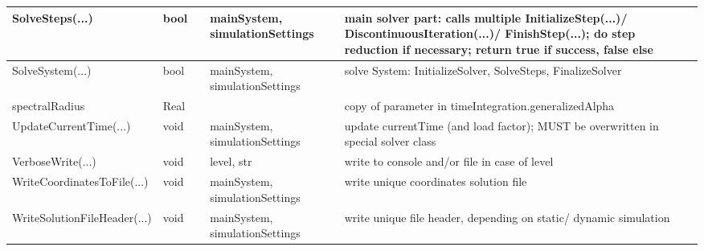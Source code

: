\begin{center}
\begin{longtable}{| p{4.2cm} | p{2.5cm} | p{0.3cm} | p{3.0cm} | p{6cm} |}
    SolveSteps(...) &     bool &      &     mainSystem, simulationSettings &     main solver part: calls multiple InitializeStep(...)/ DiscontinuousIteration(...)/ FinishStep(...); do step reduction if necessary; return true if success, false else\\ \hline
    SolveSystem(...) &     bool &      &     mainSystem, simulationSettings &     solve System: InitializeSolver, SolveSteps, FinalizeSolver\\ \hline
    spectralRadius &     Real &      &      &     copy of parameter in timeIntegration.generalizedAlpha\\ \hline
    UpdateCurrentTime(...) &     void &      &     mainSystem, simulationSettings &     update currentTime (and load factor); MUST be overwritten in special solver class\\ \hline
    VerboseWrite(...) &     void &      &     level, str &     write to console and/or file in case of level\\ \hline
    WriteCoordinatesToFile(...) &     void &      &     mainSystem, simulationSettings &     write unique coordinates solution file\\ \hline
    WriteSolutionFileHeader(...) &     void &      &     mainSystem, simulationSettings &     write unique file header, depending on static/ dynamic simulation\\ \hline
	  \end{longtable}
	\end{center}


